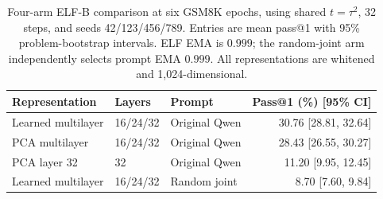 \begin{table}[t]
\caption{Four-arm ELF-B comparison at six GSM8K epochs, using shared $t=\tau^2$, 32 steps, and seeds 42/123/456/789. Entries are mean pass@1 with 95\% problem-bootstrap intervals. ELF EMA is $0.999$; the random-joint arm independently selects prompt EMA $0.999$. All representations are whitened and 1,024-dimensional.}
\label{tab:representation}
\centering\small
\setlength{\tabcolsep}{4pt}
\begin{tabular}{lllr}
\toprule
Representation & Layers & Prompt & Pass@1 (\%) [95\% CI] \\
\midrule
Learned multilayer & 16/24/32 & Original Qwen & 30.76 [28.81, 32.64] \\
PCA multilayer & 16/24/32 & Original Qwen & 28.43 [26.55, 30.27] \\
PCA layer 32 & 32 & Original Qwen & 11.20 [9.95, 12.45] \\
Learned multilayer & 16/24/32 & Random joint & 8.70 [7.60, 9.84] \\
\bottomrule
\end{tabular}
\end{table}
